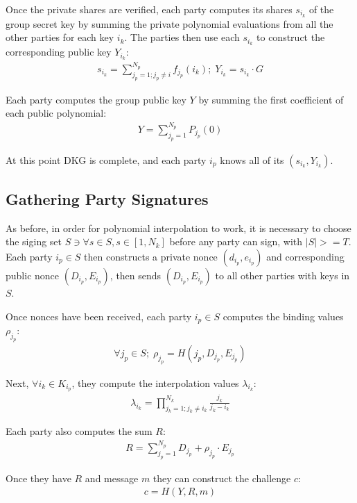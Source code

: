 \documentclass{article}
\begin{document}
Once the private shares are verified, each party computes its shares $s_{i_k}$ of the group secret key by summing the private polynomial evaluations from all the other parties for each key $i_k$. The parties then use each $s_{i_k}$ to construct the corresponding public key $Y_{i_k}$:
\begin{align}
  s_{i_k} = \sum_{j_p = 1; j_p \neq i}^{N_p} f_{j_p}(i_k) ;\; Y_{i_k} = s_{i_k} \cdot G
\end{align}

Each party computes the group public key $Y$ by summing the first coefficient of each public polynomial:
\begin{align}
  Y = \sum_{j_p=1}^{N_p} P_{j_p}(0)
\end{align}

At this point DKG is complete, and each party $i_p$ knows all of its $(s_{i_k}, Y_{i_k})$.

\subsection{
  Gathering Party Signatures
}

As before, in order for polynomial interpolation to work, it is necessary to choose the siging set $S \ni \forall s \in S, s \in [1, N_k]$ before any party can sign, with $|S| >= T$.  Each party $i_p \in S$ then constructs a private nonce $(d_{i_p},e_{i_p})$ and corresponding public nonce $(D_{i_p},E_{i_p})$, then sends $(D_{i_p},E_{i_p})$ to all other parties with keys in $S$.

Once nonces have been received, each party $i_p \in S$ computes the binding values $\rho_{j_p}$:
\begin{align}
  \forall j_p \in S;\;\rho_{j_p} = H(j_p, D_{j_p}, E_{j_p})
\end{align}

Next, $\forall i_k \in K_{i_p}$,  they compute the interpolation values $\lambda_{i_k}$:
\begin{align}
  \lambda_{i_k} = \prod_{j_k=1; j_k \neq i_k}^{N_k} \frac{j_k}{j_k - i_k}
\end{align}

Each party also computes the sum $R$:
\begin{align}
  R = \sum_{j_p=1}^{N_p} D_{j_p} + \rho_{j_p} \cdot E_{j_p}
\end{align}

Once they have $R$ and message $m$ they can construct the challenge $c$:
\begin{align}
  c = H(Y, R, m)
\end{align}
\end{document}
